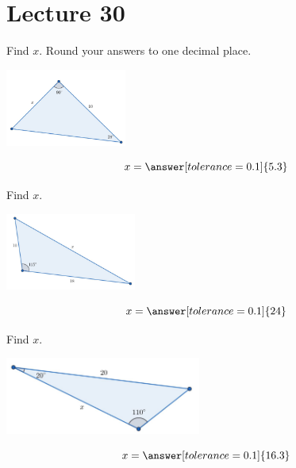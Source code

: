 \documentclass{ximera}
\begin{document}
 
 
 
 
  \section{Lecture 30}
  \begin{problem}\label{prob:160hom12prob1}
  Find $x$.  Round your answers to one decimal place.
\begin{image}
   
\includegraphics[height=1in]{160H12pic1.jpg}~
 
\end{image}
$$x=\answer[tolerance=0.1]{5.3}$$
\end{problem}

\begin{problem}\label{prob:160hom12prob2}
Find $x$.
\begin{image}
   
\includegraphics[height=1in]{160H12pic3.jpg}~
 
\end{image}
$$x=\answer[tolerance=0.1]{24}$$
\end{problem}

\begin{problem}\label{prob:160hom12prob3}
Find $x$.
\begin{image}
   
\includegraphics[height=1in]{160H12pic2.jpg}~
 
\end{image}
$$x=\answer[tolerance=0.1]{16.3}$$
\end{problem}
\end{document}
